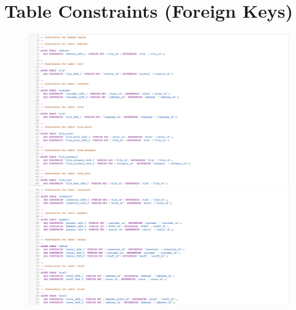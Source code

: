 \documentclass{article}
\begin{document}
\section{Table Constraints (Foreign Keys)}
	\begin{figure}[H]
		\includegraphics[width=\textwidth]{tableconstraints1}
		\includegraphics[width=\textwidth]{tableconstraints2}
	\end{figure}
\end{document}
